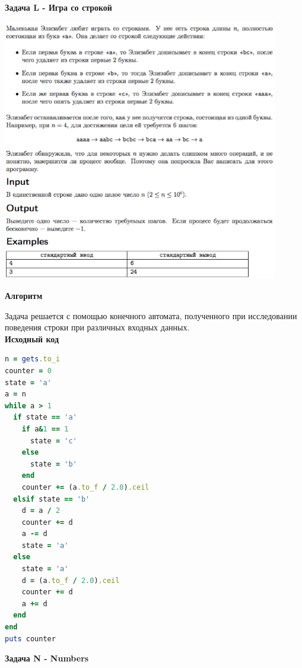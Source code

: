 \documentclass[a4paper,12pt]{article}
\begin{document}
\newpage
\textbf{{\large Задача L - Игра со строкой}}

\begin{center}
\includegraphics[width=0.9\textwidth]{OC_Bashkortostan/L.png}\\ [1cm]
\end{center}

\textbf{{\large Алгоритм}}

Задача решается с помощью конечного автомата, полученного при исследовании поведения строки при различных входных данных. \\

\textbf{{\large Исходный код}} \\
\begin{lstlisting}[language=Ruby]
n = gets.to_i
counter = 0
state = 'a'
a = n
while a > 1
  if state == 'a'
    if a&1 == 1
      state = 'c'
    else
      state = 'b'
    end
    counter += (a.to_f / 2.0).ceil
  elsif state == 'b'
    d = a / 2
    counter += d
    a -= d
    state = 'a'
  else
    state = 'a'
    d = (a.to_f / 2.0).ceil
    counter += d
    a += d
  end
end
puts counter
\end{lstlisting}


\newpage
\textbf{{\large Задача N - Numbers}}
\end{document}
